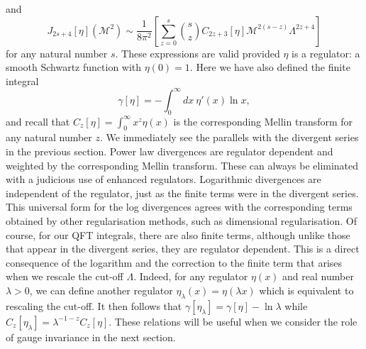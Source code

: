 \documentclass[12pt, letter]{article}
\def\be{\begin{equation}}
\def\ee{\end{equation}}
\newcommand{\M}{\mathcal{M}}
\begin{document}
and 
\be
J_{2s+4}[\eta] (\M^2) \sim \frac{1}{8 \pi^2} \left[ \sum_{z=0}^s \binom{s}{z}  C_{2z+3}[\eta]\M^{2(s-z)}\Lambda^{2z+4} \right] \label{asn}
\ee
for any natural number $s$. These expressions are valid provided $\eta$ is a regulator: a smooth Schwartz function with $\eta(0) = 1$. Here we have also defined the  finite integral
\be \label{gammanint}
\gamma[\eta]=-\int_0^\infty dx  \  \eta'(x)  \ln x,
\ee
and recall that $C_z[\eta]=\int_0^\infty x^z \eta(x)$ is the corresponding Mellin transform for  any natural number $z$.  We immediately see the parallels with the divergent series in the previous section. Power law divergences are regulator dependent and weighted by the corresponding Mellin transform. These can always be eliminated with a judicious use of enhanced regulators. Logarithmic divergences are independent of the regulator, just as the finite terms were in the divergent series.  This universal form for the log divergences agrees with the corresponding terms obtained by other regularisation methods, such as dimensional regularisation.  Of course,  for our QFT integrals, there are also finite terms, although unlike those that appear in the divergent series, they are regulator dependent. This is a direct consequence of the logarithm and the correction to the finite term that arises when we rescale the cut-off $\Lambda$.  Indeed, for any regulator $\eta(x)$ and real number $\lambda>0$, we can define another regulator $\eta_\lambda(x)=\eta(\lambda x)$ which is equivalent to rescaling the cut-off. It then follows that $\gamma[\eta_\lambda]=\gamma[\eta]-\ln \lambda$ while $C_z[\eta_\lambda]=\lambda^{-1-z} C_z[\eta]$.  These relations will be useful when we consider the role of gauge invariance in the next section.
\end{document}

